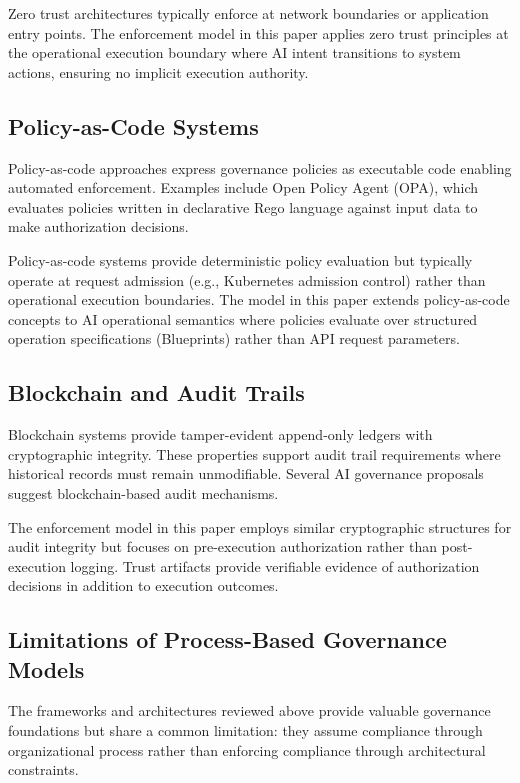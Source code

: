 \documentclass[11pt,letterpaper]{article}
\begin{document}
Zero trust architectures typically enforce at network boundaries or application entry points. The enforcement model in this paper applies zero trust principles at the operational execution boundary where AI intent transitions to system actions, ensuring no implicit execution authority.

\subsection{Policy-as-Code Systems}

Policy-as-code approaches \cite{opa2023,beda2017} express governance policies as executable code enabling automated enforcement. Examples include Open Policy Agent (OPA), which evaluates policies written in declarative Rego language against input data to make authorization decisions.

Policy-as-code systems provide deterministic policy evaluation but typically operate at request admission (e.g., Kubernetes admission control) rather than operational execution boundaries. The model in this paper extends policy-as-code concepts to AI operational semantics where policies evaluate over structured operation specifications (Blueprints) rather than API request parameters.

\subsection{Blockchain and Audit Trails}

Blockchain systems \cite{nakamoto2008} provide tamper-evident append-only ledgers with cryptographic integrity. These properties support audit trail requirements where historical records must remain unmodifiable. Several AI governance proposals \cite{brundage2020,kang2020} suggest blockchain-based audit mechanisms.

The enforcement model in this paper employs similar cryptographic structures for audit integrity but focuses on pre-execution authorization rather than post-execution logging. Trust artifacts provide verifiable evidence of authorization decisions in addition to execution outcomes.

\subsection{Limitations of Process-Based Governance Models}

The frameworks and architectures reviewed above provide valuable governance foundations but share a common limitation: they assume compliance through organizational process rather than enforcing compliance through architectural constraints.
\end{document}
